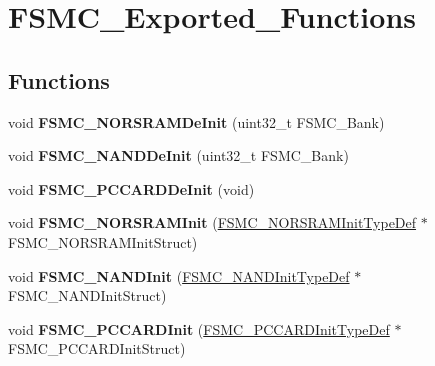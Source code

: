 \hypertarget{group__FSMC__Exported__Functions}{
\section{FSMC\_\-Exported\_\-Functions}
\label{group__FSMC__Exported__Functions}
}
\subsection*{Functions}
\begin{DoxyCompactItemize}
\item 
\hypertarget{group__FSMC__Exported__Functions_gaab3e6648e8a584e73785361ac960eded}{
void {\bfseries FSMC\_\-NORSRAMDeInit} (uint32\_\-t FSMC\_\-Bank)}
\label{group__FSMC__Exported__Functions_gaab3e6648e8a584e73785361ac960eded}

\item 
\hypertarget{group__FSMC__Exported__Functions_gafb749503293474a68555961bd8f120e1}{
void {\bfseries FSMC\_\-NANDDeInit} (uint32\_\-t FSMC\_\-Bank)}
\label{group__FSMC__Exported__Functions_gafb749503293474a68555961bd8f120e1}

\item 
\hypertarget{group__FSMC__Exported__Functions_ga2f53ccf3a4f3c80a5a56fb47ccd47ccd}{
void {\bfseries FSMC\_\-PCCARDDeInit} (void)}
\label{group__FSMC__Exported__Functions_ga2f53ccf3a4f3c80a5a56fb47ccd47ccd}

\item 
\hypertarget{group__FSMC__Exported__Functions_ga9c27816e8b17394c9ee1ce9298917b4a}{
void {\bfseries FSMC\_\-NORSRAMInit} (\hyperlink{structFSMC__NORSRAMInitTypeDef}{FSMC\_\-NORSRAMInitTypeDef} $\ast$FSMC\_\-NORSRAMInitStruct)}
\label{group__FSMC__Exported__Functions_ga9c27816e8b17394c9ee1ce9298917b4a}

\item 
\hypertarget{group__FSMC__Exported__Functions_ga9f81ccc4e126c11f1eb33077b1a68e6f}{
void {\bfseries FSMC\_\-NANDInit} (\hyperlink{structFSMC__NANDInitTypeDef}{FSMC\_\-NANDInitTypeDef} $\ast$FSMC\_\-NANDInitStruct)}
\label{group__FSMC__Exported__Functions_ga9f81ccc4e126c11f1eb33077b1a68e6f}

\item 
\hypertarget{group__FSMC__Exported__Functions_gacee1351363e7700a296faa1734a910aa}{
void {\bfseries FSMC\_\-PCCARDInit} (\hyperlink{structFSMC__PCCARDInitTypeDef}{FSMC\_\-PCCARDInitTypeDef} $\ast$FSMC\_\-PCCARDInitStruct)}
\label{group__FSMC__Exported__Functions_gacee1351363e7700a296faa1734a910aa}


\end{DoxyCompactItemize}
